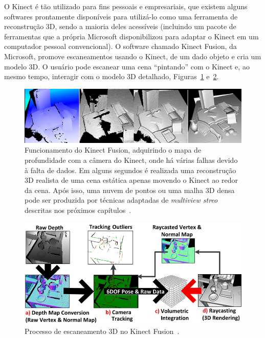 O Kinect é tão utilizado para fins pessoais e empresariais, que existem alguns
softwares prontamente disponíveis para utilizá-lo como uma ferramenta de
reconstrução 3D, sendo a maioria deles acessíveis (incluindo um pacote de ferramentas que a própria
Microsoft disponibilizou para adaptar o Kinect em um computador pessoal convencional).
O software chamado Kinect Fusion, da Microsoft, promove escaneamentos usando o Kinect, de
um dado objeto e cria um modelo 3D.  O usuário pode escanear uma cena
``pintando'' com o Kinect e, ao mesmo tempo, interagir com o modelo 3D
detalhado, Figuras~\ref{fig:KinectFusionPipe} e~\ref{fig:KinectFusionPipe2}.

\begin{figure}[!h]
	\centering
		\includegraphics[width=1\linewidth]{figs/reconstrucaoKinectFusion.png}
		\caption{%
		Funcionamento do Kinect Fusion, adquirindo o mapa de profundidade com a
    câmera do Kinect, onde há várias falhas devido à falta de dados. Em alguns
    segundos é realizada uma reconstrução 3D realista de uma cena estática
    apenas movendo o Kinect ao redor da cena. Após isso, uma nuvem de pontos ou
    uma malha 3D densa pode ser produzida por técnicas adaptadas de \emph{multiview
    streo} descritas nos próximos
    capítulos~\cite{Izadi:2011:KRR:2047196.2047270}.
	}\label{fig:KinectFusionPipe}
\end{figure}

\newpage

\begin{figure}[!h]
	\centering
		\includegraphics[width=1\linewidth]{figs/kinectfusionpipeline.png}
		\caption{%
		Processo de escaneamento 3D no Kinect
    Fusion~\cite{Izadi:2011:KRR:2047196.2047270}.
	}\label{fig:KinectFusionPipe2}
\end{figure}

